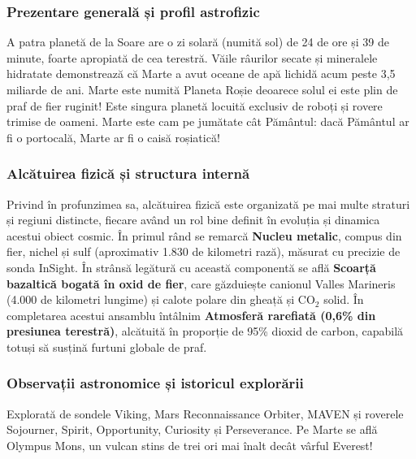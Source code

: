 \subsubsection*{Prezentare generală și profil astrofizic}
A patra planetă de la Soare are o zi solară (numită \guillemotleft{}sol\guillemotright{}) de 24 de ore și 39 de minute, foarte apropiată de cea terestră. Văile râurilor secate și mineralele hidratate demonstrează că Marte a avut oceane de apă lichidă acum peste 3,5 miliarde de ani. Marte este numită Planeta Roșie deoarece solul ei este plin de praf de fier ruginit! Este singura planetă locuită exclusiv de roboți și rovere trimise de oameni. Marte este cam pe jumătate cât Pământul: dacă Pământul ar fi o portocală, Marte ar fi o caisă roșiatică!

\subsubsection*{Alcătuirea fizică și structura internă}
Privind în profunzimea sa, alcătuirea fizică este organizată pe mai multe straturi și regiuni distincte, fiecare având un rol bine definit în evoluția și dinamica acestui obiect cosmic. În primul rând se remarcă \textbf{Nucleu metalic}, compus din fier, nichel și sulf (aproximativ 1.830 de kilometri rază), măsurat cu precizie de sonda InSight. În strânsă legătură cu această componentă se află \textbf{Scoarță bazaltică bogată în oxid de fier}, care găzduiește canionul Valles Marineris (4.000 de kilometri lungime) și calote polare din gheață și CO$_2$ solid. În completarea acestui ansamblu întâlnim \textbf{Atmosferă rarefiată (0,6\% din presiunea terestră)}, alcătuită în proporție de 95\% dioxid de carbon, capabilă totuși să susțină furtuni globale de praf.

\subsubsection*{Observații astronomice și istoricul explorării}
Explorată de sondele Viking, Mars Reconnaissance Orbiter, MAVEN și roverele Sojourner, Spirit, Opportunity, Curiosity și Perseverance. Pe Marte se află Olympus Mons, un vulcan stins de trei ori mai înalt decât vârful Everest!

